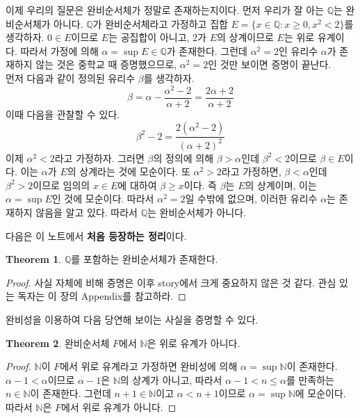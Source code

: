 \documentclass[11pt]{book}
\numberwithin{equation}{chapter}
\def\NN{\mathbb{N}}
\def\QQ{\mathbb{Q}}
\theoremstyle{definition}
\newtheorem{thm}{Theorem}[section]
\begin{document}
이제 우리의 질문은 완비순서체가 정말로 존재하는지이다. 먼저 우리가 잘 아는 \(\QQ\)는 완비순서체가 아니다. \(\QQ\)가 완비순서체라고 가정하고 집합 \(E = \{x \in \QQ : x \ge 0, x^2 < 2\}\)를 생각하자. \(0 \in E\)이므로 \(E\)는 공집합이 아니고, \(2\)가 \(E\)의 상계이므로 \(E\)는 위로 유계이다. 따라서 가정에 의해 \(\alpha = \sup E \in \QQ\)가 존재한다. 그런데 \(\alpha^2 = 2\)인 유리수 \(\alpha\)가 존재하지 않는 것은 중학교 때 증명했으므로, \(\alpha^2 = 2\)인 것만 보이면 증명이 끝난다.\\
먼저 다음과 같이 정의된 유리수 \(\beta\)를 생각하자.
\[
\beta = \alpha - \frac{\alpha^2 - 2}{\alpha + 2} = \frac{2\alpha+2}{\alpha+2}    
\]
이때 다음을 관찰할 수 있다.
\[
\beta^2 - 2 = \frac{2(\alpha^2 - 2)}{(\alpha + 2)^2}
\]
이제 \(\alpha^2 < 2\)라고 가정하자. 그러면 \(\beta\)의 정의에 의해 \(\beta > \alpha\)인데 \(\beta^2 < 2\)이므로 \(\beta \in E\)이다. 이는 \(\alpha\)가 \(E\)의 상계라는 것에 모순이다. 또 \(\alpha^2 > 2\)라고 가정하면, \(\beta < \alpha\)인데 \(\beta^2 > 2\)이므로 임의의 \(x \in E\)에 대하여 \(\beta \ge x\)이다. 즉 \(\beta\)는 \(E\)의 상계이며, 이는 \(\alpha = \sup E\)인 것에 모순이다. 따라서 \(\alpha^2 = 2\)일 수밖에 없으며, 이러한 유리수 \(\alpha\)는 존재하지 않음을 알고 있다. 따라서 \(\QQ\)는 완비순서체가 아니다.

다음은 이 노트에서 \textbf{처음 등장하는 정리}이다.

    \begin{thm}
        \(\QQ\)를 포함하는 완비순서체가 존재한다.
    \end{thm}
    \begin{proof}
        사실 자체에 비해 증명은 이후 story에서 크게 중요하지 않은 것 같다. 관심 있는 독자는 이 장의 Appendix를 참고하라.
    \end{proof}

완비성을 이용하여 다음 당연해 보이는 사실을 증명할 수 있다.

    \begin{thm}
        완비순서체 \(F\)에서 \(\NN\)은 위로 유계가 아니다.
    \end{thm}
    \begin{proof}
        \(\NN\)이 \(F\)에서 위로 유계라고 가정하면 완비성에 의해 \(\alpha = \sup \NN\)이 존재한다. \(\alpha - 1 < \alpha\)이므로 \(\alpha - 1\)은 \(\NN\)의 상계가 아니고, 따라서 \(\alpha - 1 < n \le \alpha\)를 만족하는 \(n \in \NN\)이 존재한다. 그런데 \(n + 1 \in \NN\)이고 \(\alpha < n + 1\)이므로 \(\alpha = \sup \NN\)에 모순이다. 따라서 \(\NN\)은 \(F\)에서 위로 유계가 아니다.
    \end{proof}
    
\end{document}
